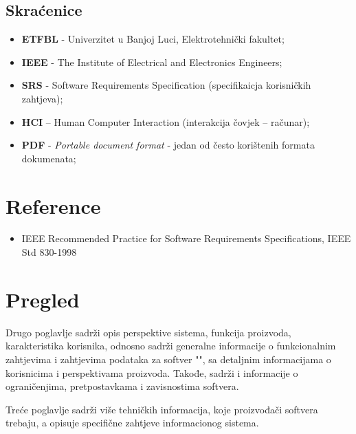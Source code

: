 \subsection{Skraćenice}
\begin{itemize}
\item \textbf{ETFBL} - Univerzitet u Banjoj Luci, Elektrotehnički fakultet;
\item \textbf{IEEE} - The Institute of Electrical and Electronics Engineers;
\item \textbf{SRS} - Software Requirements Specification (specifikaicja korisničkih zahtjeva);
\item \textbf{HCI} – Human Computer Interaction (interakcija čovjek – računar);
\item \textbf{PDF} - \textit{Portable document format} - jedan od često korištenih formata dokumenata;
\end{itemize}

\section{Reference}

\begin{itemize}
\item IEEE Recommended Practice for Software Requirements Specifications, IEEE Std 830-1998
\end{itemize}
\section{Pregled}

Drugo poglavlje sadrži opis perspektive sistema, funkcija proizvoda, karakteristika korisnika, odnosno sadrži generalne informacije o funkcionalnim zahtjevima i zahtjevima podataka za softver "\naziv", sa detaljnim informacijama o korisnicima i perspektivama proizvoda. Takođe, sadrži i informacije o ograničenjima, pretpostavkama i zavisnostima softvera.

Treće poglavlje sadrži više tehničkih informacija, koje proizvođači softvera trebaju, a opisuje specifične zahtjeve informacionog sistema.
